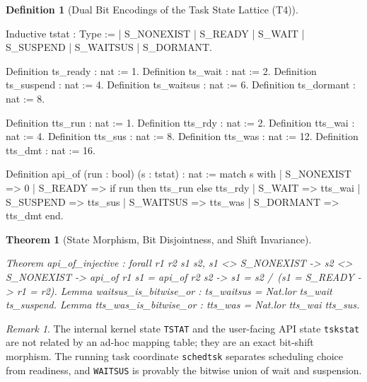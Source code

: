\documentclass[10pt,journal,compsoc,twocolumn]{article}
\newtheorem{theorem}{Theorem}[section]
\theoremstyle{definition}
\newtheorem{definition}{Definition}[section]
\theoremstyle{remark}
\newtheorem{remark}{Remark}[section]
\theoremstyle{plain}
\newcommand{\ctr}[1]{\texttt{#1}}
\begin{document}
\begin{definition}[Dual Bit Encodings of the Task State Lattice (T4)]
\label{def:acct:tron:tstat}
\begin{coc}
Inductive tstat : Type :=
  | S_NONEXIST | S_READY | S_WAIT | S_SUSPEND | S_WAITSUS | S_DORMANT.

Definition ts_ready : nat := 1.    Definition ts_wait : nat := 2.
Definition ts_suspend : nat := 4.  Definition ts_waitsus : nat := 6.
Definition ts_dormant : nat := 8.

Definition tts_run : nat := 1.     Definition tts_rdy : nat := 2.
Definition tts_wai : nat := 4.     Definition tts_sus : nat := 8.
Definition tts_was : nat := 12.    Definition tts_dmt : nat := 16.

Definition api_of (run : bool) (s : tstat) : nat :=
  match s with
  | S_NONEXIST => 0
  | S_READY    => if run then tts_run else tts_rdy
  | S_WAIT     => tts_wai   | S_SUSPEND  => tts_sus
  | S_WAITSUS  => tts_was   | S_DORMANT  => tts_dmt
  end.
\end{coc}\end{definition}
\begin{theorem}[State Morphism, Bit Disjointness, and Shift Invariance]
\begin{coc}
Theorem api_of_injective : forall r1 r2 s1 s2,
  s1 <> S_NONEXIST -> s2 <> S_NONEXIST ->
  api_of r1 s1 = api_of r2 s2 -> s1 = s2 /\ (s1 = S_READY -> r1 = r2).
Lemma waitsus_is_bitwise_or : ts_waitsus = Nat.lor ts_wait ts_suspend.
Lemma tts_was_is_bitwise_or : tts_was = Nat.lor tts_wai tts_sus.
\end{coc}\end{theorem}
\begin{remark}
The internal kernel state \ctr{TSTAT} and the user-facing API state \ctr{tskstat}
are not related by an ad-hoc mapping table; they are an exact bit-shift morphism.
The running task coordinate \ctr{schedtsk} separates scheduling choice from readiness,
and \ctr{WAITSUS} is provably the bitwise union of wait and suspension.
\end{remark}
\end{document}
